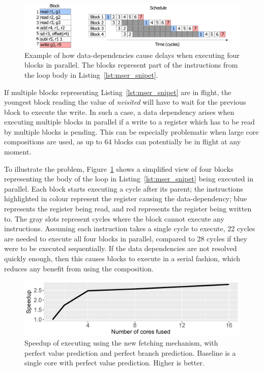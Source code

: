 \begin{figure}[t]
    \centering
    \includegraphics[width=1\textwidth]{chapter3/graphics/mser_ex.pdf}
    \caption{Example of how data-dependencies cause delays when executing four blocks in parallel. The blocks represent part of the instructions from the loop body in Listing~\ref{lst:mser_snipet}.}
    \label{fig:mser_nvsited}
	\vspace{1em}
\end{figure}

If multiple blocks representing Listing~\ref{lst:mser_snipet} are in flight, the youngest block reading the value of \textit{nvisited} will have to wait for the previous block to execute the write.
In such a case, a data dependency arises when executing multiple blocks in parallel if a write to a register which has to be read by multiple blocks is pending.
This can be especially problematic when large core compositions are used, as up to 64 blocks can potentially be in flight at any moment.

To illustrate the problem, Figure~\ref{fig:mser_nvsited} shows a simplified view of four blocks representing the body of the loop in Listing~\ref{lst:mser_snipet} being executed in parallel.
Each block starts executing a cycle after its parent; the instructions highlighted in colour represent the register causing the data-dependency; blue represents the register being read, and red represents the register being written to.
The gray slots represent cycles where the block cannot execute any instructions.
Assuming each instruction takes a single cycle to execute, 22 cycles are needed to execute all four blocks in parallel, compared to 28 cycles if they were to be executed sequentially.
If the data dependencies are not resolved quickly enough, then this causes blocks to execute in a serial fashion, which reduces any benefit from using the composition.

\begin{figure}[t]
    \centering
    \includegraphics[width=1\textwidth]{chapter3/graphics/mser_motiv_reg.pdf}
    \caption{Speedup of executing  using the new fetching mechanism, with perfect value prediction and perfect branch prediction. Baseline is a single core with perfect value prediction. Higher is better.}
    \label{fig:motivation_reg}
	\vspace{1em}
\end{figure}


